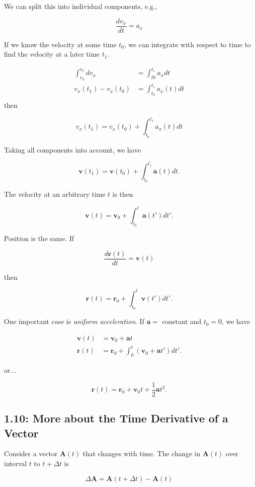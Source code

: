 \documentclass[12pt,twoside]{article}
\begin{document}
\begin{flushleft}
We can split this into individual components, e.g.,

$$
\frac{dv_x}{dt} = a_x
$$

If we know the velocity at some time $t_0$, we can integrate with respect to time to find the velocity at a later time $t_1$.

\begin{align*}
  \int_{v_0}^{v_1} dv_x &= \int_{t0}^{t_1} a_x dt \\
  v_x(t_1) - v_x(t_0) &= \int_{t_0}^{t_1} a_x(t)dt \\
\end{align*}
then

$$
v_x(t_1) = v_x(t_0) + \int_{t_0}^{t_1} a_x(t)dt
$$

Taking all components into account, we have

$$
\mathbf{v}(t_1) = \mathbf{v}(t_0) + \int_{t_0}^{t_1}\mathbf{a}(t)dt.
$$

The velocity at an arbitrary time $t$ is then

$$
\mathbf{v}(t) = \mathbf{v}_0 + \int_{t_0}^{t}\mathbf{a}(t')dt'.
$$

Position is the same. If

$$
\frac{d\mathbf{r}(t)}{dt} = \mathbf{v}(t)
$$

then

$$
\mathbf{r}(t) = \mathbf{r}_0 + \int_{t_0}^{t}\mathbf{v}(t')dt'.
$$

One important case is \textit{uniform acceleration}. If $\mathbf{a} = $ constant and $t_0 = 0$, we have

\begin{align*}
  \mathbf{v}(t) &= \mathbf{v}_0 + \mathbf{a}t \\
  \mathbf{r}(t) &= \mathbf{r}_0 + \int_{0}^t(\mathbf{v}_0 + \mathbf{a}t')dt'.
\end{align*}

or...

$$
\mathbf{r}(t) = \mathbf{r}_0 + \mathbf{v}_0t + \frac{1}{2}\mathbf{a}t^2.
$$

\subsection*{1.10: More about the Time Derivative of a Vector}

Consider a vector $\mathbf{A}(t)$ that changes with time. The change in $\mathbf{A}(t)$  over interval $t$ to $t + \Delta t$ is

$$
\Delta\mathbf{A} = \mathbf{A}(t + \Delta t) - \mathbf{A}(t)
$$


\end{flushleft}
\end{document}
